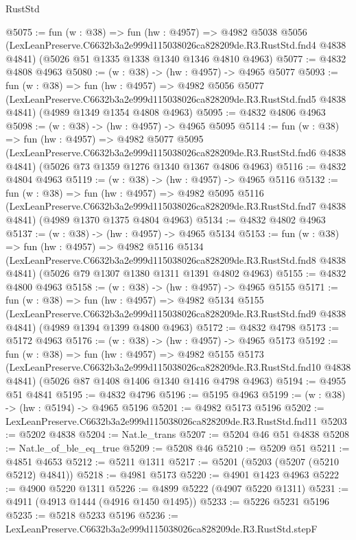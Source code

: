\begin{lexlean}{RustStd}
\begin{coremodule}
@5075 := fun (w : @38) =>
  fun (hw : @4957) =>
  @4982
    @5038
    @5056
    (LexLeanPreserve.C6632b3a2e999d115038026ca828209de.R3.RustStd.fnd4 @4838 @4841)
    (@5026 @51 @1335 @1338 @1340 @1346 @4810 @4963)
@5077 := @4832 @4808 @4963
@5080 := (w : @38) -> (hw : @4957) -> @4965 @5077
@5093 := fun (w : @38) =>
  fun (hw : @4957) =>
  @4982
    @5056
    @5077
    (LexLeanPreserve.C6632b3a2e999d115038026ca828209de.R3.RustStd.fnd5 @4838 @4841)
    (@4989 @1349 @1354 @4808 @4963)
@5095 := @4832 @4806 @4963
@5098 := (w : @38) -> (hw : @4957) -> @4965 @5095
@5114 := fun (w : @38) =>
  fun (hw : @4957) =>
  @4982
    @5077
    @5095
    (LexLeanPreserve.C6632b3a2e999d115038026ca828209de.R3.RustStd.fnd6 @4838 @4841)
    (@5026 @73 @1359 @1276 @1340 @1367 @4806 @4963)
@5116 := @4832 @4804 @4963
@5119 := (w : @38) -> (hw : @4957) -> @4965 @5116
@5132 := fun (w : @38) =>
  fun (hw : @4957) =>
  @4982
    @5095
    @5116
    (LexLeanPreserve.C6632b3a2e999d115038026ca828209de.R3.RustStd.fnd7 @4838 @4841)
    (@4989 @1370 @1375 @4804 @4963)
@5134 := @4832 @4802 @4963
@5137 := (w : @38) -> (hw : @4957) -> @4965 @5134
@5153 := fun (w : @38) =>
  fun (hw : @4957) =>
  @4982
    @5116
    @5134
    (LexLeanPreserve.C6632b3a2e999d115038026ca828209de.R3.RustStd.fnd8 @4838 @4841)
    (@5026 @79 @1307 @1380 @1311 @1391 @4802 @4963)
@5155 := @4832 @4800 @4963
@5158 := (w : @38) -> (hw : @4957) -> @4965 @5155
@5171 := fun (w : @38) =>
  fun (hw : @4957) =>
  @4982
    @5134
    @5155
    (LexLeanPreserve.C6632b3a2e999d115038026ca828209de.R3.RustStd.fnd9 @4838 @4841)
    (@4989 @1394 @1399 @4800 @4963)
@5172 := @4832 @4798
@5173 := @5172 @4963
@5176 := (w : @38) -> (hw : @4957) -> @4965 @5173
@5192 := fun (w : @38) =>
  fun (hw : @4957) =>
  @4982
    @5155
    @5173
    (LexLeanPreserve.C6632b3a2e999d115038026ca828209de.R3.RustStd.fnd10 @4838 @4841)
    (@5026 @87 @1408 @1406 @1340 @1416 @4798 @4963)
@5194 := @4955 @51 @4841
@5195 := @4832 @4796
@5196 := @5195 @4963
@5199 := (w : @38) -> (hw : @5194) -> @4965 @5196
@5201 := @4982 @5173 @5196
@5202 := LexLeanPreserve.C6632b3a2e999d115038026ca828209de.R3.RustStd.fnd11
@5203 := @5202 @4838
@5204 := Nat.le_trans
@5207 := @5204 @46 @51 @4838
@5208 := Nat.le_of_ble_eq_true
@5209 := @5208 @46
@5210 := @5209 @51
@5211 := @4851 @4653
@5212 := @5211 @1311
@5217 := @5201 (@5203 (@5207 (@5210 @5212) @4841))
@5218 := @4981 @5173
@5220 := @4901 @1423 @4963
@5222 := @4900 @5220 @1311
@5226 := @4899 @5222 (@4907 @5220 @1311)
@5231 := @4911 (@4913 @1444 (@4916 @1450 @1495))
@5233 := @5226 @5231 @5196
@5235 := @5218 @5233 @5196
@5236 := LexLeanPreserve.C6632b3a2e999d115038026ca828209de.R3.RustStd.stepF

\end{coremodule}
\end{lexlean}
